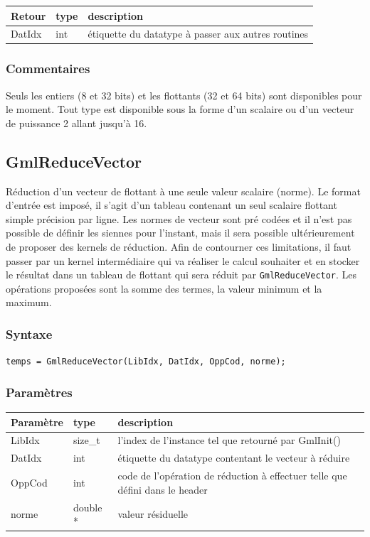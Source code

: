 \documentclass[a4paper,12pt]{article}
\begin{document}
\begin{tabular}{|m{2cm}|m{1.5cm}|m{10.5cm}|}
\hline
Retour     & type   & description \\
\hline
DatIdx     & int    & étiquette du datatype à passer aux autres routines \\
\hline
\end{tabular}

\subsubsection*{Commentaires}
Seuls les entiers (8 et 32 bits) et les flottants (32 et 64 bits) sont disponibles pour le moment.
Tout type est disponible sous la forme d'un scalaire ou d'un vecteur de puissance 2 allant jusqu'à 16.


\subsection{GmlReduceVector}

Réduction d'un vecteur de flottant à une seule valeur scalaire (norme).
Le format d'entrée est imposé, il s'agit d'un tableau contenant un seul scalaire flottant simple précision par ligne.
Les normes de vecteur sont pré codées et il n'est pas possible de définir les siennes pour l'instant, mais il sera possible ultérieurement de proposer des kernels de réduction.
Afin de contourner ces limitations, il faut passer par un kernel intermédiaire qui va réaliser le calcul souhaiter et en stocker le résultat dans un tableau de flottant qui sera réduit par {\tt GmlReduceVector}.
Les opérations proposées sont la somme des termes, la valeur minimum et la maximum.

\subsubsection*{Syntaxe}

{\tt temps = GmlReduceVector(LibIdx, DatIdx, OppCod, norme);}

\subsubsection*{Paramètres}

\begin{tabular}{|m{2cm}|m{1.5cm}|m{10.5cm}|}
\hline
Paramètre  & type     & description \\
\hline
LibIdx     & size\_t  & l'index de l'instance tel que retourné par GmlInit() \\
\hline
DatIdx     & int      & étiquette du datatype contentant le vecteur à réduire  \\
\hline
OppCod     & int      & code de l'opération de réduction à effectuer telle que défini dans le header \\
\hline
norme      & double * & valeur résiduelle \\
\hline
\end{tabular}
\end{document}
